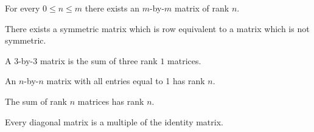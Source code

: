 \documentclass{homework}
\begin{document}
\begin{problem}
  For every $0 \leq n \leq m$ there exists an $m$-by-$m$ matrix of rank $n$.
\end{problem}

\begin{problem}
  There exists a symmetric matrix which is row equivalent to a matrix which
  is not symmetric.
\end{problem}

\begin{problem}
  A $3$-by-$3$ matrix is the sum of three rank $1$ matrices.
\end{problem}

\begin{problem}
  An $n$-by-$n$ matrix with all entries equal to 1 has rank $n$.
\end{problem}

\begin{problem}
  The sum of rank $n$ matrices has rank $n$.
\end{problem}

\begin{problem}
  Every diagonal matrix is a multiple of the identity matrix.
\end{problem}
\end{document}
